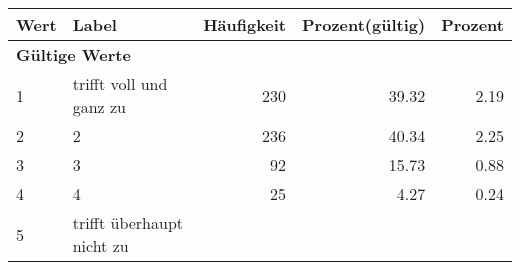      \begin{longtable}{lXrrr}
     \toprule
     \textbf{Wert} & \textbf{Label} & \textbf{Häufigkeit} & \textbf{Prozent(gültig)} & \textbf{Prozent} \\
     \endhead
     \midrule
     \multicolumn{5}{l}{\textbf{Gültige Werte}}\\

     1 &
     \multicolumn{1}{X}{ trifft voll und ganz zu   } &


       \num{230} &
       \num[round-mode=places,round-precision=2]{39,32} &
         \num[round-mode=places,round-precision=2]{2,19} \\

     2 &
     \multicolumn{1}{X}{ 2   } &


       \num{236} &
       \num[round-mode=places,round-precision=2]{40,34} &
         \num[round-mode=places,round-precision=2]{2,25} \\

     3 &
     \multicolumn{1}{X}{ 3   } &


       \num{92} &
       \num[round-mode=places,round-precision=2]{15,73} &
         \num[round-mode=places,round-precision=2]{0,88} \\

     4 &
     \multicolumn{1}{X}{ 4   } &


       \num{25} &
       \num[round-mode=places,round-precision=2]{4,27} &
         \num[round-mode=places,round-precision=2]{0,24} \\

     5 &
     \multicolumn{1}{X}{ trifft überhaupt nicht zu   } &



\end{longtable}
